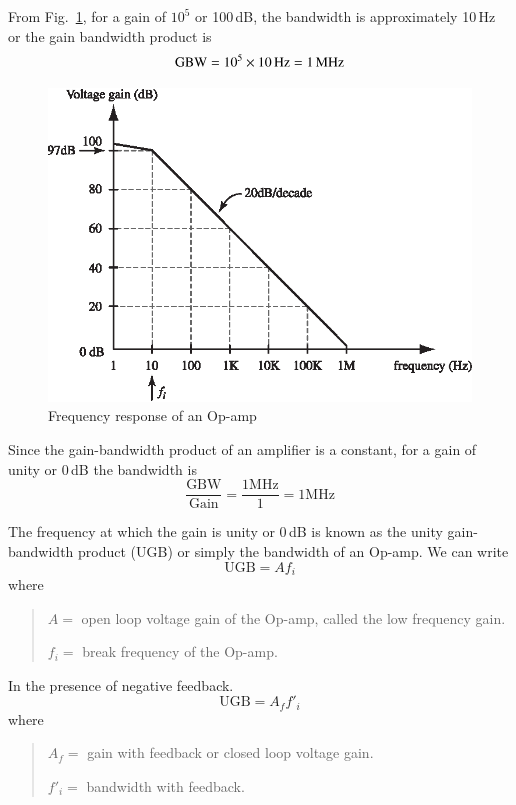 From Fig.~\ref{fig5.5}, for a gain of $10^{5}$ or 100\,dB, the bandwidth is approximately 10\,Hz or the gain bandwidth product is
$$
\text{GBW}=10^{5}\times 10\,{\rm Hz}=1\,\text{MHz}
$$
\begin{figure}[H]
\centering
\includegraphics[scale=1.1]{chap4/S3-EE-06-007.eps}
\caption{Frequency response of an Op-amp}\label{fig5.5}
\end{figure}

Since the gain-bandwidth product of an amplifier is a constant, for a gain of unity or 0\,dB the bandwidth is
$$
\frac{\text{GBW}}{\text{Gain}}=\frac{\text{1MHz}}{1}=1\text{MHz}
$$

The frequency at which the gain is unity or 0\,dB is known as the unity gain-bandwidth product (UGB) or simply the bandwidth of an Op-amp. We can write
\begin{equation}
\text{UGB}=Af_{i}\label{eq5.6}
\end{equation}
where
\begin{quote}
$A=$ open loop voltage gain of the Op-amp, called the low frequency gain.

$f_{i}=$ break frequency of the Op-amp.
\end{quote}

\eject

In the presence of negative feedback. 
\begin{equation}
\text{UGB}=A_{f}f'_{i}\label{eq5.7}
\end{equation}
where
\begin{quote}
$A_{f}=$ gain with feedback or closed loop voltage gain.

$f'_{i}=$ bandwidth with feedback.
\end{quote}

